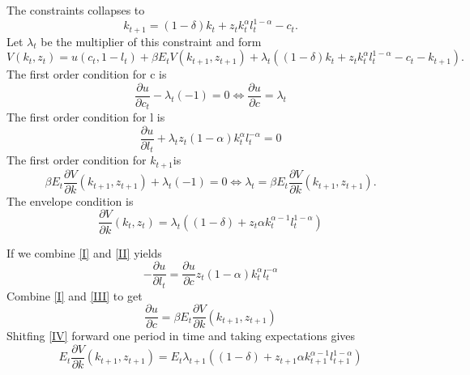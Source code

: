 \documentclass[a4paper,12pt]{article}
\begin{document}
The constraints collapses to 
\begin{equation*}
k_{t+1}=\left( 1-\delta \right) k_{t}+z_{t}k_{t}^{\alpha }l_{t}^{1-\alpha
}-c_{t}.
\end{equation*}%
Let $\lambda _{t}$ be the multiplier of this constraint and form 
\begin{equation*}
V\left( k_{t},z_{t}\right) =u\left( c_{t},1-l_{t}\right) +\beta E_{t}V\left(
k_{t+1},z_{t+1}\right) +\lambda _{t}\left( \left( 1-\delta \right)
k_{t}+z_{t}k_{t}^{\alpha }l_{t}^{1-\alpha }-c_{t}-k_{t+1}\right) .
\end{equation*}%
The first order condition for c is%
\begin{equation}
\frac{\partial u}{\partial c_{t}}-\lambda _{t}\left( -1\right)
=0\Leftrightarrow \frac{\partial u}{\partial c}=\lambda _{t}  \tag{I}
\label{I}
\end{equation}%
The first order condition for l is%
\begin{equation}
\frac{\partial u}{\partial l_{t}}+\lambda _{t}z_{t}\left( 1-\alpha \right)
k_{t}^{\alpha }l_{t}^{-\alpha }=0  \tag{II}  \label{II}
\end{equation}%
The first order condition for $k_{t+1}$is 
\begin{equation}
\beta E_{t}\frac{\partial V}{\partial k}\left( k_{t+1},z_{t+1}\right)
+\lambda _{t}\left( -1\right) =0\Leftrightarrow \lambda _{t}=\beta E_{t}%
\frac{\partial V}{\partial k}\left( k_{t+1},z_{t+1}\right) .  \tag{III}
\label{III}
\end{equation}%
The envelope condition is 
\begin{equation}
\frac{\partial V}{\partial k}\left( k_{t},z_{t}\right) =\lambda _{t}\left(
\left( 1-\delta \right) +z_{t}\alpha k_{t}^{\alpha -1}l_{t}^{1-\alpha
}\right)   \tag{IV}  \label{IV}
\end{equation}

If we combine \ref{I} and \ref{II} yields%
\begin{equation}
-\frac{\partial u}{\partial l_{t}}=\frac{\partial u}{\partial c}z_{t}\left(
1-\alpha \right) k_{t}^{\alpha }l_{t}^{-\alpha }  \tag{V}  \label{V}
\end{equation}%
Combine \ref{I} and \ref{III} to get%
\begin{equation}
\frac{\partial u}{\partial c}=\beta E_{t}\frac{\partial V}{\partial k}\left(
k_{t+1},z_{t+1}\right)   \tag{VI}  \label{VI}
\end{equation}%
Shitfing \ref{IV} forward one period in time and taking expectations gives%
\begin{equation}
E_{t}\frac{\partial V}{\partial k}\left( k_{t+1},z_{t+1}\right)
=E_{t}\lambda _{t+1}\left( \left( 1-\delta \right) +z_{t+1}\alpha
k_{t+1}^{\alpha -1}l_{t+1}^{1-\alpha }\right)   \tag{VII}  \label{VII}
\end{equation}
\end{document}
